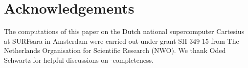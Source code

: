 \section{Acknowledgements}
The computations of this paper on the Dutch national supercomputer Cartesius
at SURFsara in Amsterdam  were carried out under grant
SH-349-15 from The Netherlands Organisation for Scientific Research (NWO).
We thank Oded Schwartz for helpful discussions on \NP-completeness.
